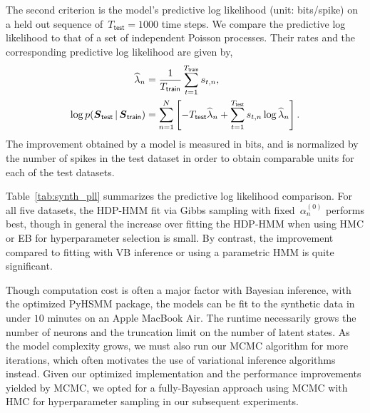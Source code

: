 The second criterion is the model's predictive log likelihood (unit:
bits/spike) on a held out sequence of~${T_{\mathsf{test}}=1000}$ time steps. We
compare the predictive log likelihood to that of a set of independent
Poisson processes. Their rates and the corresponding predictive log
likelihood are given by,
\begin{align*}
\widehat{\lambda}_n 
  &=\frac{1}{T_{\mathsf{train}}}\sum_{t=1}^{T_{\mathsf{train}}} s_{t,n}, \\
  \log p(\boldsymbol{S}_{\mathsf{test}} \,|\, \boldsymbol{S}_{\mathsf{train}}) &= \sum_{n=1}^N \left[ -T_{\mathsf{test}} \widehat{\lambda}_n + \sum_{t=1}^{T_{\mathsf{test}}} s_{t,n} \log \widehat{\lambda}_n  \right].
\end{align*}
The improvement obtained by a model is measured in bits, and is
normalized by the number of spikes in the test dataset in order to
obtain comparable units for each of the test datasets.

Table~\ref{tab:synth_pll} summarizes the predictive log likelihood
comparison.  For all five datasets, the HDP-HMM fit via Gibbs sampling
with fixed~$\alpha_n^{(0)}$ performs best, though in general the increase
over fitting the HDP-HMM when using HMC or EB for hyperparameter
selection is small. By contrast, the improvement compared to fitting
with VB inference or using a parametric HMM is quite significant.

Though computation cost is often a major factor with Bayesian
inference, with the optimized PyHSMM package, the models can be fit to
the synthetic data in under $10$ minutes on an Apple MacBook Air. The
runtime necessarily grows the number of neurons and the truncation
limit on the number of latent states. As the model complexity grows,
we must also run our MCMC algorithm for more iterations, which often
motivates the use of variational inference algorithms instead. Given
our optimized implementation and the performance improvements yielded
by MCMC, we opted for a fully-Bayesian approach using MCMC with HMC
for hyperparameter sampling in our subsequent experiments.

